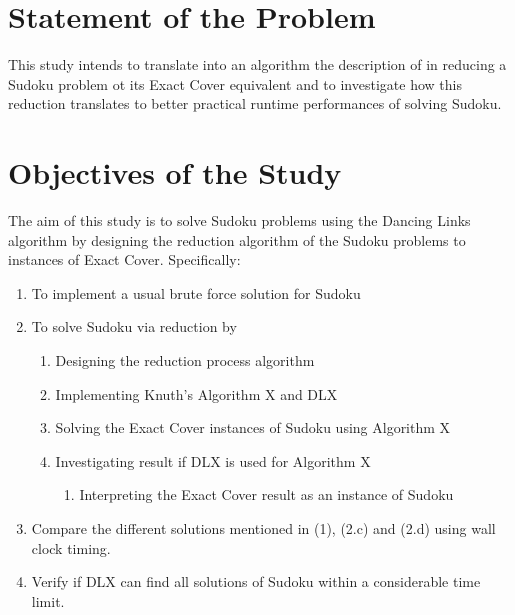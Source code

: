 \documentclass[a4paper,oneside,11pt]{report}
\begin{document}
\begin{figure}[h]
  \centering
  \caption{}
\end{figure}
\newpage

\section{Statement of the Problem}
This study intends to translate into an algorithm the description of \cite{Harrysson} in reducing a Sudoku problem ot its Exact Cover equivalent and to investigate how this reduction translates to better practical runtime performances of solving Sudoku.

\section{Objectives of the Study}
The aim of this study is to solve Sudoku problems using the Dancing Links algorithm by designing the reduction algorithm of the Sudoku problems to instances of Exact Cover. Specifically:
\begin{enumerate}
\item To implement a usual brute force solution for Sudoku
\item To solve Sudoku via reduction by
\begin{enumerate}
\item Designing the reduction process algorithm
\item Implementing Knuth$’$s Algorithm X and DLX
\item Solving the Exact Cover instances of Sudoku using Algorithm X
\item Investigating result if DLX is used for Algorithm X
\begin{enumerate}
\item Interpreting the Exact Cover result as an instance of Sudoku
\end{enumerate}
\end{enumerate}
\item Compare the different solutions mentioned in (1), (2.c) and (2.d) using wall clock timing.
\item Verify if DLX can find all solutions of Sudoku within a considerable time limit.
\end{enumerate}
\end{document}
